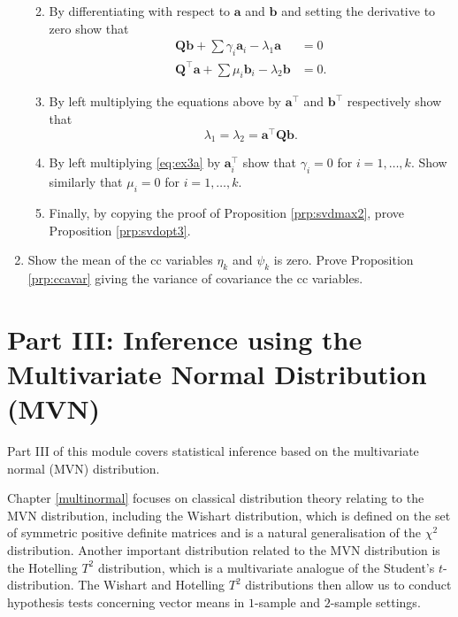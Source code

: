 \documentclass[]{book}
\theoremstyle{definition}
\theoremstyle{definition}
\theoremstyle{definition}
\theoremstyle{remark}
\begin{document}
\begin{enumerate}
  \begin{enumerate}
  \def\labelenumii{\roman{enumii}.}
  \item
    By differentiating with respect to \(\mathbf a\) and \(\mathbf b\) and setting the derivative to zero show that
    \begin{align}
     \mathbf Q\mathbf b+ \sum\gamma_i \mathbf a_i - \lambda_1 \mathbf a&= 0 \label{eq:ex3a}\\
     \mathbf Q^\top\mathbf a+ \sum\mu_i \mathbf b_i - \lambda_2 \mathbf b&= 0. \label{eq:ex3b} 
     \end{align}
  \item
    By left multiplying the equations above by \(\mathbf a^\top\) and \(\mathbf b^\top\) respectively show that
    \[\lambda_1=\lambda_2 = \mathbf a^\top \mathbf Q\mathbf b.\]
  \item
    By left multiplying \eqref{eq:ex3a} by \(\mathbf a_i^\top\) show that \(\gamma_i=0\) for \(i=1, \ldots, k\). Show similarly that \(\mu_i =0\) for \(i=1, \ldots, k\).
  \item
    Finally, by copying the proof of Proposition \ref{prp:svdmax2}, prove Proposition \ref{prp:svdopt3}.
  \end{enumerate}
\item
  Show the mean of the cc variables \(\eta_k\) and \(\psi_k\) is zero. Prove Proposition \ref{prp:ccavar} giving the variance of covariance the cc variables.
\end{enumerate}

\hypertarget{part-iii-inference-using-the-multivariate-normal-distribution-mvn}{%
\chapter*{Part III: Inference using the Multivariate Normal Distribution (MVN)}\label{part-iii-inference-using-the-multivariate-normal-distribution-mvn}}

Part III of this module covers statistical inference based on the multivariate normal (MVN) distribution.

Chapter \ref{multinormal} focuses on classical distribution theory relating to the MVN distribution, including the Wishart distribution, which is defined on the set of symmetric positive definite matrices and is a natural generalisation of the \(\chi^2\) distribution. Another important distribution related to the MVN distribution is the Hotelling \(T^2\) distribution, which is a multivariate analogue of the Student's \(t\)-distribution.
The Wishart and Hotelling \(T^2\) distributions then allow us to conduct hypothesis tests concerning vector means in \(1\)-sample and \(2\)-sample settings.
\end{document}
